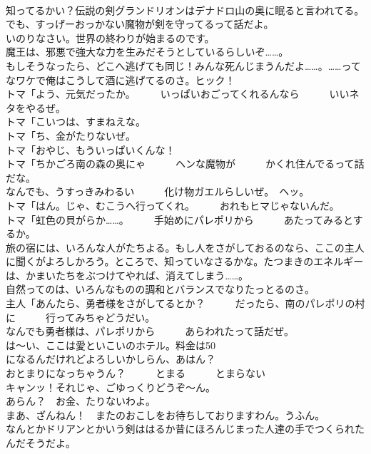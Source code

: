 \documentclass[8pt]{extreport}
\begin{document}
\begin{CJK}{UTF8}{min}
\\	知ってるかい？伝説の剣グランドリオンはデナドロ山の奥に眠ると言われてる。	
\\	でも、すっげーおっかない魔物が剣を守ってるって話だよ。	
\\	いのりなさい。世界の終わりが始まるのです。	
\\	魔王は、邪悪で強大な力を生みだそうとしているらしいぞ……。	
\\	もしそうなったら、どこへ逃げても同じ！みんな死んじまうんだよ……。……ってなワケで俺はこうして酒に逃げてるのさ。ヒック！	
\\	トマ「よう、元気だったか。　　　いっぱいおごってくれるんなら　　　いいネタをやるぜ。	
\\	トマ「こいつは、すまねえな。	
\\	トマ「ち、金がたりないぜ。	
\\	トマ「おやじ、もういっぱいくんな！	
\\	トマ「ちかごろ南の森の奥にゃ　　　ヘンな魔物が　　　かくれ住んでるって話だな。	
\\	なんでも、うすっきみわるい　　　化け物ガエルらしいぜ。　ヘッ。	
\\	トマ「はん。じゃ、むこうへ行ってくれ。　　　おれもヒマじゃないんだ。	
\\	トマ「虹色の貝がらか……。　　　手始めにパレポリから　　　あたってみるとするか。	
\\	旅の宿には、いろんな人がたちよる。もし人をさがしておるのなら、ここの主人に聞くがよろしかろう。ところで、知っていなさるかな。たつまきのエネルギーは、かまいたちをぶつけてやれば、消えてしまう……。	
\\	自然ってのは、いろんなものの調和とバランスでなりたっとるのさ。	
\\	主人「あんたら、勇者様をさがしてるとか？　　　だったら、南のパレポリの村に　　　行ってみちゃどうだい。	
\\	なんでも勇者様は、パレポリから　　　あらわれたって話だぜ。	
\\	は～い、ここは愛といこいのホテル。料金は50
\\	になるんだけれどよろしいかしらん、あはん？	
\\	おとまりになっちゃうん？　　　とまる　　　とまらない	
\\	キャンッ！それじゃ、ごゆっくりどうぞ～ん。	
\\	あらん？　お金、たりないわよ。	
\\	まあ、ざんねん！　またのおこしをお待ちしておりますわん。うふん。	
\\	なんとかドリアンとかいう剣ははるか昔にほろんじまった人達の手でつくられたんだそうだよ。	

\end{CJK}
\end{document}
